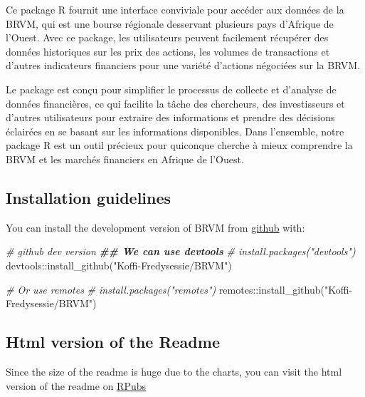 \documentclass[
]{article}
\newenvironment{Shaded}{\begin{snugshade}}{\end{snugshade}}
\newcommand{\CommentTok}[1]{\textcolor[rgb]{0.56,0.35,0.01}{\textit{#1}}}
\newcommand{\DocumentationTok}[1]{\textcolor[rgb]{0.56,0.35,0.01}{\textbf{\textit{#1}}}}
\newcommand{\FunctionTok}[1]{\textcolor[rgb]{0.00,0.00,0.00}{#1}}
\newcommand{\NormalTok}[1]{#1}
\newcommand{\SpecialCharTok}[1]{\textcolor[rgb]{0.00,0.00,0.00}{#1}}
\newcommand{\StringTok}[1]{\textcolor[rgb]{0.31,0.60,0.02}{#1}}
\begin{document}
Ce package R fournit une interface conviviale pour accéder aux données
de la BRVM, qui est une bourse régionale desservant plusieurs pays
d'Afrique de l'Ouest. Avec ce package, les utilisateurs peuvent
facilement récupérer des données historiques sur les prix des actions,
les volumes de transactions et d'autres indicateurs financiers pour une
variété d'actions négociées sur la BRVM.

Le package est conçu pour simplifier le processus de collecte et
d'analyse de données financières, ce qui facilite la tâche des
chercheurs, des investisseurs et d'autres utilisateurs pour extraire des
informations et prendre des décisions éclairées en se basant sur les
informations disponibles. Dans l'ensemble, notre package R est un outil
précieux pour quiconque cherche à mieux comprendre la BRVM et les
marchés financiers en Afrique de l'Ouest.

\hypertarget{installation-guidelines}{%
\subsection{Installation guidelines}\label{installation-guidelines}}

You can install the development version of BRVM from
\href{https://github.com/Koffi-Fredysessie/BRVM}{github} with:

\begin{Shaded}
\begin{Highlighting}[]
\CommentTok{\# github dev version}
\DocumentationTok{\#\# We can use devtools}
\CommentTok{\# install.packages("devtools")}
\NormalTok{devtools}\SpecialCharTok{::}\FunctionTok{install\_github}\NormalTok{(}\StringTok{"Koffi{-}Fredysessie/BRVM"}\NormalTok{)}

\CommentTok{\# Or use remotes}
\CommentTok{\# install.packages("remotes")}
\NormalTok{remotes}\SpecialCharTok{::}\FunctionTok{install\_github}\NormalTok{(}\StringTok{"Koffi{-}Fredysessie/BRVM"}\NormalTok{)}
\end{Highlighting}
\end{Shaded}

\hypertarget{html-version-of-the-readme}{%
\subsection{Html version of the
Readme}\label{html-version-of-the-readme}}

Since the size of the readme is huge due to the charts, you can visit
the html version of the readme on
\href{https://rpubs.com/Fredysessie/Readme_BRVM_Stock}{RPubs}
\end{document}
